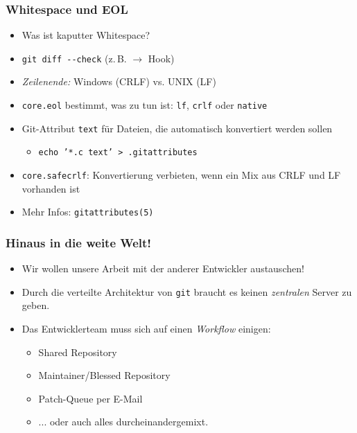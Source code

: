\documentclass{beamer}
\begin{document}
\begin{frame}
 \frametitle{Whitespace und EOL}
  


\begin{itemize}
  \item Was ist kaputter Whitespace?
  \item \texttt{git diff -{}-check} (z.\,B. $\rightarrow$ Hook)
\end{itemize}

\begin{itemize}
  \item \emph{Zeilenende:} Windows (CRLF) vs. UNIX (LF)
  \item \texttt{core.eol} bestimmt, was zu tun ist: \texttt{lf}, \texttt{crlf} oder \texttt{native}
  \item Git-Attribut \texttt{text} für Dateien, die automatisch konvertiert werden sollen
\begin{itemize}
  \item \texttt{echo '*.c text' > .gitattributes}
\end{itemize}
  \item \texttt{core.safecrlf}: Konvertierung verbieten, wenn ein Mix aus CRLF und LF vorhanden ist
  \item Mehr Infos: \texttt{gitattributes(5)}
\end{itemize}

  
 \end{frame}
\begin{frame}
 \frametitle{Hinaus in die weite Welt!}
  


\begin{itemize}
  \item Wir wollen unsere Arbeit mit der anderer Entwickler austauschen!
  \item Durch die verteilte Architektur von \texttt{git} braucht es keinen \emph{zentralen} Server zu geben.
  \item Das Entwicklerteam muss sich auf einen \emph{Workflow} einigen:
\begin{itemize}
  \item Shared Repository
  \item Maintainer/Blessed Repository
  \item Patch-Queue per E-Mail
  \item ... oder auch alles durcheinandergemixt.
\end{itemize}
\end{itemize}

  
 \end{frame}
\end{document}
